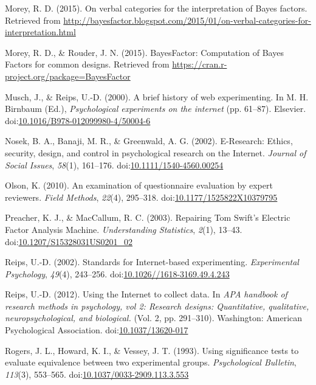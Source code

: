 \documentclass[english,man, mask]{apa6}
\theoremstyle{definition}
\theoremstyle{definition}
\theoremstyle{definition}
\theoremstyle{remark}
\begin{document}
\hypertarget{ref-Morey2015c}{}
Morey, R. D. (2015). On verbal categories for the interpretation of
Bayes factors. Retrieved from
\url{http://bayesfactor.blogspot.com/2015/01/on-verbal-categories-for-interpretation.html}

\hypertarget{ref-Morey2015b}{}
Morey, R. D., \& Rouder, J. N. (2015). BayesFactor: Computation of Bayes
Factors for common designs. Retrieved from
\url{https://cran.r-project.org/package=BayesFactor}

\hypertarget{ref-Musch2000}{}
Musch, J., \& Reips, U.-D. (2000). A brief history of web experimenting.
In M. H. Birnbaum (Ed.), \emph{Psychological experiments on the
internet} (pp. 61--87). Elsevier.
doi:\href{https://doi.org/10.1016/B978-012099980-4/50004-6}{10.1016/B978-012099980-4/50004-6}

\hypertarget{ref-Nosek2002}{}
Nosek, B. A., Banaji, M. R., \& Greenwald, A. G. (2002). E-Research:
Ethics, security, design, and control in psychological research on the
Internet. \emph{Journal of Social Issues}, \emph{58}(1), 161--176.
doi:\href{https://doi.org/10.1111/1540-4560.00254}{10.1111/1540-4560.00254}

\hypertarget{ref-Olson2010}{}
Olson, K. (2010). An examination of questionnaire evaluation by expert
reviewers. \emph{Field Methods}, \emph{22}(4), 295--318.
doi:\href{https://doi.org/10.1177/1525822X10379795}{10.1177/1525822X10379795}

\hypertarget{ref-Preacher2003}{}
Preacher, K. J., \& MacCallum, R. C. (2003). Repairing Tom Swift's
Electric Factor Analysis Machine. \emph{Understanding Statistics},
\emph{2}(1), 13--43.
doi:\href{https://doi.org/10.1207/S15328031US0201_02}{10.1207/S15328031US0201\_02}

\hypertarget{ref-Reips2002a}{}
Reips, U.-D. (2002). Standards for Internet-based experimenting.
\emph{Experimental Psychology}, \emph{49}(4), 243--256.
doi:\href{https://doi.org/10.1026//1618-3169.49.4.243}{10.1026//1618-3169.49.4.243}

\hypertarget{ref-Reips2012}{}
Reips, U.-D. (2012). Using the Internet to collect data. In \emph{APA
handbook of research methods in psychology, vol 2: Research designs:
Quantitative, qualitative, neuropsychological, and biological.} (Vol. 2,
pp. 291--310). Washington: American Psychological Association.
doi:\href{https://doi.org/10.1037/13620-017}{10.1037/13620-017}

\hypertarget{ref-Rogers1993}{}
Rogers, J. L., Howard, K. I., \& Vessey, J. T. (1993). Using
significance tests to evaluate equivalence between two experimental
groups. \emph{Psychological Bulletin}, \emph{113}(3), 553--565.
doi:\href{https://doi.org/10.1037/0033-2909.113.3.553}{10.1037/0033-2909.113.3.553}
\end{document}

